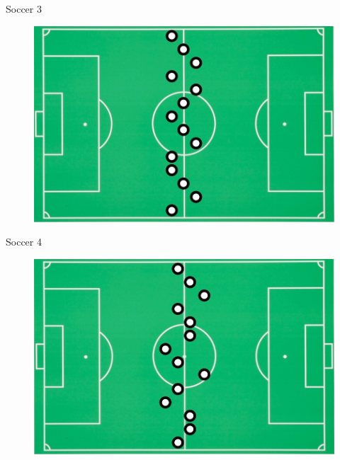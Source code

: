 \documentclass[handout]{beamer}
\begin{document}
\begin{frame}{Soccer 3}
 \begin{figure}[h!]
	\centering
	\includegraphics[scale=0.3]{pics/soccer3.png}
\end{figure}


\end{frame}


\begin{frame}{Soccer 4}
 \begin{figure}[h!]
	\centering
	\includegraphics[scale=0.3]{pics/soccer4.png}
\end{figure}
\end{frame}
\end{document}
